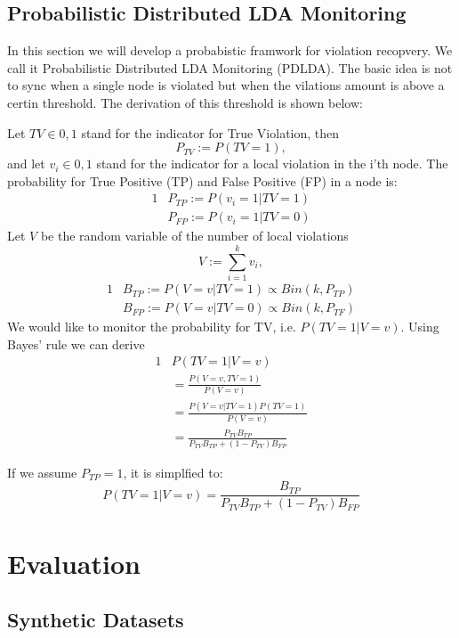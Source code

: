 \documentclass[11pt,twocolumn,varwidth=true,a4paper,fleqn]{article}
\begin{document}
\subsection{Probabilistic Distributed LDA Monitoring}
In this section we will develop a probabistic framwork for violation recopvery.
We call it Probabilistic Distributed LDA Monitoring (PDLDA). The basic idea is
not to sync when a single node is violated but when the vilations amount is
above a certin threshold. The derivation of this threshold is shown below:

Let $TV \in {0,1}$ stand for the indicator for True
Violation, then  
\begin{equation*}
P_{TV} := P(TV = 1),
\end{equation*}
and let $v_i \in {0,1}$ stand for the indicator for a local violation in the
i'th node. The probability for True Positive (TP) and False Positive (FP) in a
node is:
\begin{alignat*}{1}
& P_{TP} := P(v_i=1 | TV=1) \\
& P_{FP} := P(v_i=1 | TV=0)
\end{alignat*}
Let $V$ be the random variable of the number of local violations
\begin{equation*}
V := \sum_{i=1}^k v_i,
\end{equation*}
\begin{alignat*}{1}
& B_{TP} := P(V=v | TV=1) \propto Bin(k,P_{TP}) \\
& B_{FP} := P(V=v | TV=0) \propto Bin(k,P_{TF})
\end{alignat*}
We would like to monitor the probability for TV, i.e. $P(TV=1|V=v)$. Using
Bayes' rule we can derive
\begin{alignat*}{1}
& P(TV=1|V=v) \\
& = \frac{P(V=v, TV=1)}{P(V=v)}\\
& = \frac{P(V=v|TV=1)P(TV=1)}{P(V=v)} \\
& = \frac{P_{TV}B_{TP}}{P_{TV}B_{TP} + (1-P_{TV})B_{FP}}
\end{alignat*}

If we assume $P_{TP}=1$, it is simplfied to:
\begin{equation*}
P(TV=1|V=v) = \frac{B_{TP}}{P_{TV}B_{TP} + (1-P_{TV})B_{FP}}
\end{equation*}
\section{Evaluation}
\subsection{Synthetic Datasets}
\end{document}
